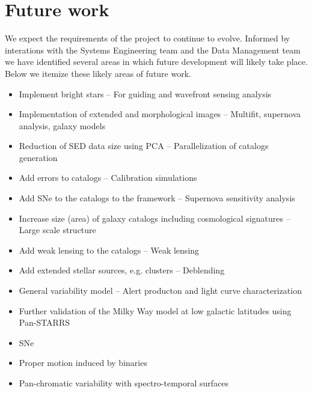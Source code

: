 \documentclass[]{article}
\begin{document}
\section{Future work}
We expect the requirements of the project to continue to evolve.  Informed by interations with the Systems Engineering team and the Data Management team we have 
identified several areas in which future development will likely take place.  Below we itemize these likely areas of future work.
\begin{itemize}
\item Implement bright stars -- For guiding and wavefront sensing analysis
\item Implementation of extended and morphological images -- Multifit, supernova analysis, galaxy models
\item Reduction of SED data size using PCA -- Parallelization of catalogs generation
\item Add errors to catalogs -- Calibration simulations
\item Add SNe to the catalogs to the framework -- Supernova sensitivity analysis
\item Increase size (area) of galaxy catalogs including cosmological signatures -- Large scale structure
\item Add weak lensing to the catalogs -- Weak lensing
\item Add extended stellar sources, e.g. clusters -- Deblending
\item General variability model -- Alert producton and light curve characterization
\item Further validation of the Milky Way model at low galactic latitudes using Pan-STARRS
\item SNe
\item Proper motion induced by binaries
\item Pan-chromatic variability with spectro-temporal surfaces
\end{itemize}


\end{document}
